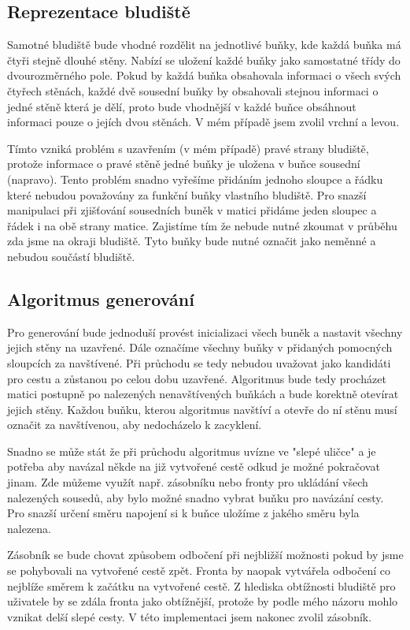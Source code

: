 \documentclass[12pt]{article}
\begin{document}
\subsection{Reprezentace bludiště}
Samotné bludiště bude vhodné rozdělit na jednotlivé buňky, kde každá buňka má čtyři stejně dlouhé stěny. Nabízí se uložení každé buňky jako samostatné třídy do dvourozměrného pole. Pokud by každá buňka obsahovala informaci o všech svých čtyřech stěnách, každé dvě sousední buňky by obsahovali stejnou informaci o jedné stěně která je dělí, proto bude vhodnější v každé buňce obsáhnout informaci pouze o jejích dvou stěnách. V mém případě jsem zvolil vrchní a levou. 

Tímto vzniká problém s uzavřením (v mém případě) pravé strany bludiště, protože informace o pravé stěně jedné buňky je uložena v buňce sousední (napravo). Tento problém snadno vyřešíme přidáním jednoho sloupce a řádku které nebudou považovány za funkční buňky vlastního bludiště. Pro snazší manipulaci při zjišťování sousedních buněk v matici přidáme jeden sloupec a řádek i na obě strany matice. Zajistíme tím že nebude nutné zkoumat v průběhu zda jsme na okraji bludiště. Tyto buňky bude nutné označit jako neměnné a nebudou součástí bludiště.

\subsection{Algoritmus generování}
Pro generování bude jednoduší provést inicializaci všech buněk a nastavit všechny jejich stěny na uzavřené. Dále označíme všechny buňky v přidaných pomocných sloupcích za navštívené. Při průchodu se tedy nebudou uvažovat jako kandidáti pro cestu a zůstanou po celou dobu uzavřené. Algoritmus bude tedy procházet matici postupně po nalezených nenavštívených buňkách a bude korektně otevírat jejich stěny. Každou buňku, kterou algoritmus navštíví a otevře do ní stěnu musí označit za navštívenou, aby nedocházelo k zacyklení.

Snadno se může stát že při průchodu algoritmus uvízne ve "slepé uličce" a je potřeba aby navázal někde na již vytvořené cestě odkud je možné pokračovat jinam. Zde můžeme využít např. zásobníku nebo fronty pro ukládání všech nalezených sousedů, aby bylo možné snadno vybrat buňku pro navázání cesty. Pro snazší určení směru napojení si k buňce uložíme z jakého směru byla nalezena. 

Zásobník se bude chovat způsobem odbočení při nejbližší možnosti pokud by jsme se pohybovali na vytvořené cestě zpět. Fronta by naopak vytvářela odbočení co nejblíže směrem k začátku na vytvořené cestě. Z hlediska obtížnosti bludiště pro uživatele by se zdála fronta jako obtížnější, protože by podle mého názoru mohlo vznikat delší slepé cesty. V této implementaci jsem nakonec zvolil zásobník.
\end{document}
